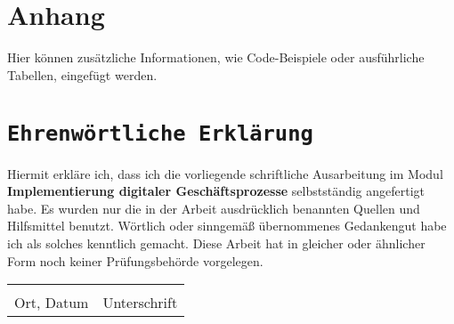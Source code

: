 \documentclass[a4paper,12pt]{article}
\begin{document}
\newpage
\appendix
\section{Anhang}
Hier können zusätzliche Informationen, wie Code-Beispiele oder ausführliche Tabellen, eingefügt werden.

\newpage
{}
\section*{\texttt{Ehrenwörtliche Erklärung}}
Hiermit erkläre ich, dass ich die vorliegende schriftliche Ausarbeitung im Modul \textbf{Implementierung digitaler Geschäftsprozesse} selbstständig
angefertigt habe. Es wurden nur die in der Arbeit ausdrücklich benannten Quellen und
Hilfsmittel benutzt. Wörtlich oder sinngemäß übernommenes Gedankengut habe ich als
solches kenntlich gemacht. Diese Arbeit hat in gleicher oder ähnlicher Form noch keiner
Prüfungsbehörde vorgelegen.

\vspace{3cm}
\noindent\begin{tabular}{p{}p{}}
    \hrulefill & \hrulefill \\
    Ort, Datum & Unterschrift \\
\end{tabular}
\end{document}
